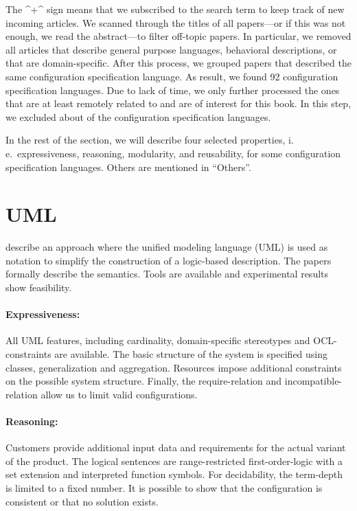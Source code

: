 The ^+^ sign means that we subscribed to the search term to keep track of new incoming articles.
We scanned through the titles of all papers---or if this was not enough, we read the abstract---to filter off-topic papers.
In particular, we removed all articles that describe general purpose languages, behavioral descriptions, or that are domain-specific.
After this process, we grouped papers that described the same configuration specification language.
As result, we found 92 configuration specification languages.
Due to lack of time, we only further processed the ones that are at least remotely related to  and are of interest for this book.
In this step, we excluded about  of the configuration specification languages.

In the rest of the section, we will describe four selected properties, i.\,e.\ expressiveness, reasoning, modularity, and reusability, for some configuration specification languages.
Others are mentioned in ``Others''.

\section{UML}

\citet{felfernig1999knowledge,felfernig2000uml,felfernig2002joint} describe an approach where the unified modeling language (UML) is used as notation to simplify the construction of a logic-based description.
The papers formally describe the semantics. Tools are available and experimental results show feasibility.

\paragraph*{Expressiveness:}
All UML features, including cardinality, domain-specific stereotypes and OCL-constraints are available.
The basic structure of the system is specified using classes, generalization and aggregation.
Resources impose additional constraints on the possible system structure.
Finally, the require-relation and incompatible-relation allow us to limit valid configurations.

\paragraph*{Reasoning:}
Customers provide additional input data and requirements for the actual variant of the product.
The logical sentences are range-restricted first-order-logic with a set extension and interpreted function symbols.
For decidability, the term-depth is limited to a fixed number.
It is possible to show that the configuration is consistent or that no solution exists.

